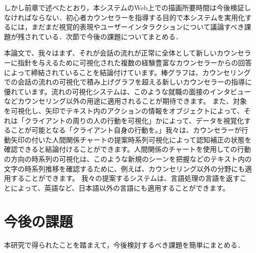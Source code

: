 \documentclass[shuuron]{kuee}
\begin{document}
しかし前章で述べたとおり，本システムのWeb上での描画所要時間は今後検証しなければならない．初心者カウンセラーを指導する目的で本システムを実用化するには，まだまだ視覚的表現やユーザーインタラクションについて議論すべき課題が残されている．次節で今後の課題についてまとめる．



本論文で、我々はまず、それが会話の流れが正常に全体として新しいカウンセラーに指針を与えるために可視化された複数の経験豊富なカウンセラーからの回答によって締結されていることを結論付けています。棒グラフは、カウンセリングでの会話の流れの可視化で積み上げグラフを超える新しいカウンセラーの指導に優れています。流れの可視化システムは、このような就職の面接のインタビューなどカウンセリング以外の用途に適用されることが期待できます。
  また、対象を可視化し、矢印でテキスト内のアクションの情報をオブジェクトによって、それは「クライアントの周りの人の行動を可視化」かによって、データを視覚化することが可能となる「クライアント自身の行動を。」我々は、カウンセラーが行動矢印の付いた人間関係チャートの提案時系列可視化によって認知補正の状態を確認できると結論付けることができます。人間関係のチャートを使用しての行動の方向の時系列の可視化は、このような新規のシーンを把握などのテキスト内の文字の時系列推移を確認するために、例えば、カウンセリング以外の分野にも適用することができます。
    我々の提案するシステムは、言語処理の言語を返すことによって、英語など、日本語以外の言語にも適用することができます。



\section{今後の課題}

本研究で得られたことを踏まえて，今後検討するべき課題を簡単にまとめる．
\end{document}
